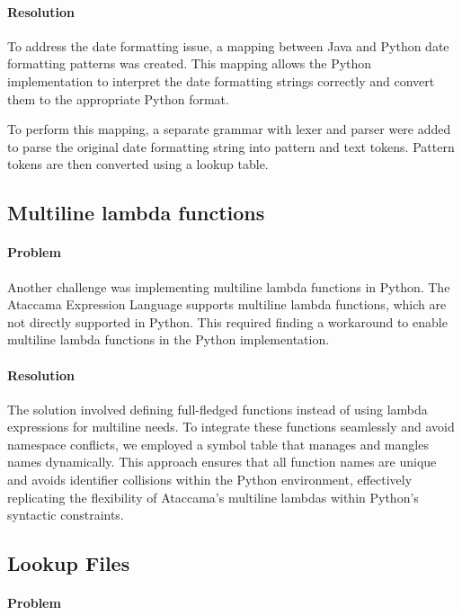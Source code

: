 \paragraph{Resolution}

To address the date formatting issue, a mapping between Java and Python date formatting patterns was created. This mapping allows the Python implementation to interpret the date formatting strings correctly and convert them to the appropriate Python format.

To perform this mapping, a separate grammar with lexer and parser were added to parse the original date formatting string into pattern and text tokens. Pattern tokens are then converted using a lookup table.

\subsection{Multiline lambda functions}

\paragraph{Problem}

Another challenge was implementing multiline lambda functions in Python. The Ataccama Expression Language supports multiline lambda functions, which are not directly supported in Python. This required finding a workaround to enable multiline lambda functions in the Python implementation.

\paragraph{Resolution}

The solution involved defining full-fledged functions instead of using lambda expressions for multiline needs. To integrate these functions seamlessly and avoid namespace conflicts, we employed a symbol table that manages and mangles names dynamically. This approach ensures that all function names are unique and avoids identifier collisions within the Python environment, effectively replicating the flexibility of Ataccama's multiline lambdas within Python's syntactic constraints.
\subsection{Lookup Files}
\paragraph{Problem}

